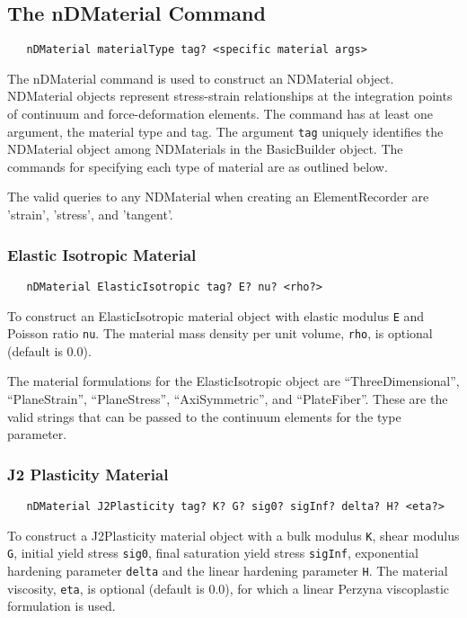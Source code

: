 \documentclass[12pt]{article}
\begin{document}
\subsection{The nDMaterial Command}
{\sf\small
\begin{verbatim}
   nDMaterial materialType tag? <specific material args>
\end{verbatim}
}

The nDMaterial command is used to construct an NDMaterial object. NDMaterial
objects represent stress-strain relationships at the integration points of
continuum and force-deformation elements. The command has at least one
argument, the material type and tag. The argument {\tt tag} uniquely
identifies the NDMaterial object among NDMaterials in the BasicBuilder
object. The commands for specifying
each type of material are as outlined below.  

The valid queries to any NDMaterial when creating an ElementRecorder
are 'strain', 'stress', and 'tangent'.

\subsubsection{Elastic Isotropic Material}
{\sf\small
\begin{verbatim}
   nDMaterial ElasticIsotropic tag? E? nu? <rho?>
\end{verbatim}
}

To construct an ElasticIsotropic material object with elastic modulus
{\tt E} and Poisson ratio {\tt nu}. The material mass density per unit
volume, {\tt rho}, is optional (default is 0.0).

The material formulations for the ElasticIsotropic object are
``ThreeDimensional'', ``PlaneStrain'', ``PlaneStress'', ``AxiSymmetric'',
and ``PlateFiber''. These are the valid strings that can be passed to the
continuum elements for the type parameter. 

\subsubsection{J2 Plasticity Material}
{\sf\small
\begin{verbatim}
   nDMaterial J2Plasticity tag? K? G? sig0? sigInf? delta? H? <eta?>
\end{verbatim}
}

To construct a J2Plasticity material object with a bulk modulus
{\tt K}, shear modulus {\tt G}, initial yield stress {\tt sig0}, final
saturation yield stress {\tt sigInf}, exponential hardening parameter
{\tt delta} and the linear hardening parameter {\tt H}. The material
viscosity, {\tt eta}, is optional (default is 0.0), for which a linear
Perzyna viscoplastic formulation is used.
\end{document}
